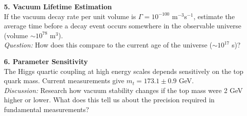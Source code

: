 {\vspace{1em}

\textbf{5. Vacuum Lifetime Estimation} \\[0.5em]
If the vacuum decay rate per unit volume is $\Gamma = 10^{-100}$ m$^{-3}$s$^{-1}$, estimate the average time before a decay event occurs somewhere in the observable universe (volume $\sim 10^{78}$ m$^3$). \\
\emph{Question:} How does this compare to the current age of the universe ($\sim 10^{17}$ s)?

\vspace{1em}

\textbf{6. Parameter Sensitivity} \\[0.5em]
The Higgs quartic coupling at high energy scales depends sensitively on the top quark mass. Current measurements give $m_t = 173.1 \pm 0.9$ GeV. \\
\emph{Discussion:} Research how vacuum stability changes if the top mass were 2 GeV higher or lower. What does this tell us about the precision required in fundamental measurements?
}
